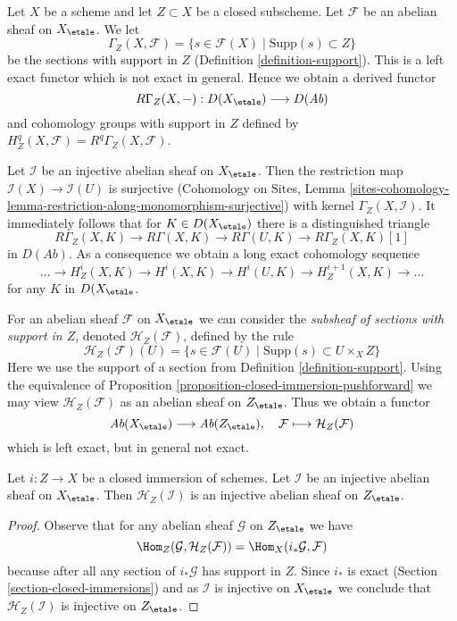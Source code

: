 \noindent
Let $X$ be a scheme and let $Z \subset X$ be a closed subscheme.
Let $\mathcal{F}$ be an abelian sheaf on $X_\etale$. We let
$$
\Gamma_Z(X, \mathcal{F}) =
\{s \in \mathcal{F}(X) \mid \text{Supp}(s) \subset Z\}
$$
be the sections with support in $Z$ (Definition \ref{definition-support}).
This is a left exact functor which is not exact in general.
Hence we obtain a derived functor
$$
R\Gamma_Z(X, -) : D(X_\etale) \longrightarrow D(\textit{Ab})
$$
and cohomology groups with support in $Z$ defined by
$H^q_Z(X, \mathcal{F}) = R^q\Gamma_Z(X, \mathcal{F})$.

\medskip\noindent
Let $\mathcal{I}$ be an injective abelian sheaf on $X_\etale$. Then the
restriction map $\mathcal{I}(X) \to \mathcal{I}(U)$ is surjective
(Cohomology on Sites, Lemma
\ref{sites-cohomology-lemma-restriction-along-monomorphism-surjective})
with kernel $\Gamma_Z(X, \mathcal{I})$. It immediately follows that
for $K \in D(X_\etale)$ there is a distinguished triangle
$$
R\Gamma_Z(X, K) \to R\Gamma(X, K) \to R\Gamma(U, K) \to R\Gamma_Z(X, K)[1]
$$
in $D(\textit{Ab})$. As a consequence we obtain a long exact cohomology
sequence
$$
\ldots \to H^i_Z(X, K) \to H^i(X, K) \to H^i(U, K) \to
H^{i + 1}_Z(X, K) \to \ldots
$$
for any $K$ in $D(X_\etale$.

\medskip\noindent
For an abelian sheaf $\mathcal{F}$ on $X_\etale$ we can consider
the {\it subsheaf of sections with support in $Z$}, denoted
$\mathcal{H}_Z(\mathcal{F})$, defined by the rule
$$
\mathcal{H}_Z(\mathcal{F})(U) =
\{s \in \mathcal{F}(U) \mid \text{Supp}(s) \subset U \times_X Z\}
$$
Here we use the support of a section from Definition \ref{definition-support}.
Using the equivalence of
Proposition \ref{proposition-closed-immersion-pushforward}
we may view $\mathcal{H}_Z(\mathcal{F})$ as an abelian sheaf on
$Z_\etale$. Thus we obtain a functor
$$
\textit{Ab}(X_\etale) \longrightarrow \textit{Ab}(Z_\etale),\quad
\mathcal{F} \longmapsto \mathcal{H}_Z(\mathcal{F})
$$
which is left exact, but in general not exact.

\begin{lemma}
\label{lemma-sections-with-support-acyclic}
Let $i : Z \to X$ be a closed immersion of schemes.
Let $\mathcal{I}$ be an injective abelian sheaf on $X_\etale$.
Then $\mathcal{H}_Z(\mathcal{I})$ is an injective abelian sheaf
on $Z_\etale$.
\end{lemma}

\begin{proof}
Observe that for any abelian sheaf $\mathcal{G}$ on $Z_\etale$
we have
$$
\Hom_Z(\mathcal{G}, \mathcal{H}_Z(\mathcal{F})) =
\Hom_X(i_*\mathcal{G}, \mathcal{F})
$$
because after all any section of $i_*\mathcal{G}$ has support in $Z$.
Since $i_*$ is exact (Section \ref{section-closed-immersions}) and as
$\mathcal{I}$ is injective on $X_\etale$ we conclude that
$\mathcal{H}_Z(\mathcal{I})$ is injective on $Z_\etale$.
\end{proof}

